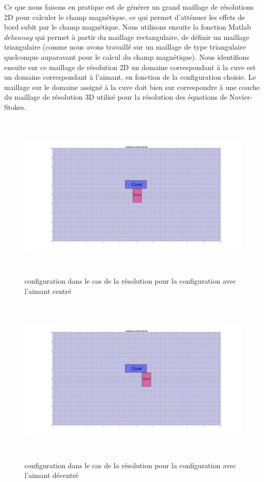 \documentclass[a4paper,12pt,titlepage]{report}
\begin{document}
\begin{onehalfspace}
Ce que nous faisons en pratique est de générer un grand maillage de résolutions 2D pour calculer le champ magnétique, ce qui permet d'atténuer les effets de bord subit par le champ magnétique. 
\newline
Nous utilisons ensuite la fonction Matlab $delaunay$ qui permet à partir du maillage rectangulaire, de définir un maillage triangulaire (comme nous avons travaillé sur un maillage de type triangulaire quelconque auparavant pour le calcul du champ magnétique).
Nous identifions ensuite sur ce maillage de résolution 2D un domaine correspondant à la cuve est un domaine correspondant à l'aimant, en fonction de la configuration choisie. Le maillage sur le domaine assigné à la cuve doit bien sur correspondre à une couche du maillage de résolution 3D utilisé pour la résolution des équations de Navier-Stokes.

\begin{figure}[!h]
	\includegraphics[height = 8cm, keepaspectratio]{graphes/maillage_resolution_total_centre.jpg}
	\caption{\label{figure 3z } configuration dans le cas de la résolution pour la configuration avec l'aimant centré}
\end{figure}
\begin{figure}[!h]
	\includegraphics[height = 8cm, keepaspectratio]{graphes/maillage_resolution_total_decentre.jpg}
	\caption{\label{figure 3r } configuration dans le cas de la résolution pour la configuration avec l'aimant décentré}
\end{figure}


\end{onehalfspace}
\end{document}
